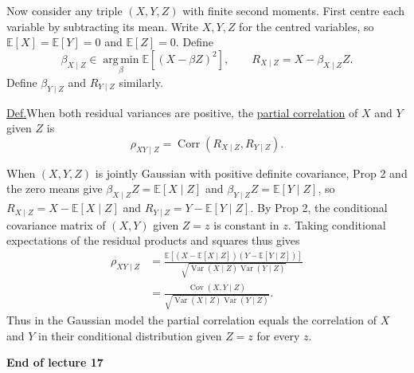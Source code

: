 \documentclass[11pt,a4paper]{article}
\begin{document}
Now consider any triple $(X,Y,Z)$ with finite second moments. First
centre each variable by subtracting its mean. Write $X,Y,Z$ for the
centred variables, so $\mathbb E[X]=\mathbb E[Y]=0$ and
$\mathbb E[Z]=0$. Define
\[
\beta_{X\mid Z}
\in\operatorname*{arg\,min}_{\beta}\mathbb E[(X-\beta Z)^2],
\qquad R_{X\mid Z}=X-\beta_{X\mid Z}Z.
\]
Define $\beta_{Y\mid Z}$ and $R_{Y\mid Z}$ similarly.

\medskip
\noindent\underline{Def.}\quad When both residual variances are positive,
the \underline{partial correlation} of $X$ and $Y$ given $Z$ is
\[
\rho_{XY\mid Z}=\operatorname{Corr}(R_{X\mid Z},R_{Y\mid Z}).
\]

\begin{samepage}
When $(X,Y,Z)$ is jointly Gaussian with positive definite covariance,
Prop 2 and the zero means give
$\beta_{X\mid Z}Z=\mathbb E[X\mid Z]$ and
$\beta_{Y\mid Z}Z=\mathbb E[Y\mid Z]$, so
$R_{X\mid Z}=X-\mathbb E[X\mid Z]$ and $R_{Y\mid Z}=Y-\mathbb E[Y\mid Z]$.
By Prop 2, the conditional covariance matrix of $(X,Y)$ given $Z=z$
is constant in $z$. Taking conditional expectations of the residual
products and squares thus gives
\[
\begin{aligned}
\rho_{XY\mid Z}
&=\frac{\mathbb E[(X-\mathbb E[X\mid Z])(Y-\mathbb E[Y\mid Z])]}
 {\sqrt{\operatorname{Var}(X\mid Z)\operatorname{Var}(Y\mid Z)}}\\
&=\frac{\operatorname{Cov}(X,Y\mid Z)}
 {\sqrt{\operatorname{Var}(X\mid Z)\operatorname{Var}(Y\mid Z)}}.
\end{aligned}
\]
Thus in the Gaussian model the partial correlation equals the
correlation of $X$ and $Y$ in their conditional distribution given $Z=z$
for every $z$.

\begin{center}
\textbf{End of lecture 17}
\end{center}
\end{samepage}
\end{document}
